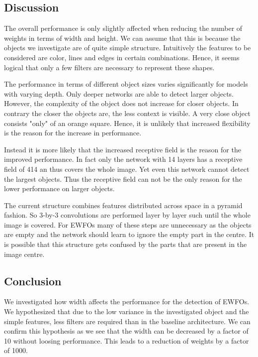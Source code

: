 \subsection{Discussion}

The overall performance is only slightly affected when reducing the number of weights in terms of width and height. We can assume that this is because the objects we investigate are of quite simple structure. Intuitively the features to be considered are color, lines and edges in certain combinations. Hence, it seems logical that only a few filters are necessary to represent these shapes.

The performance in terms of different object sizes varies significantly for models with varying depth. Only deeper networks are able to detect larger objects. However, the complexity of the object does not increase for closer objects. In contrary the closer the objects are, the less context is visible. A very close object consists "only" of an orange square. Hence, it is unlikely that increased flexibility is the reason for the increase in performance. 

Instead it is more likely that the increased receptive field is the reason for the improved performance. In fact only the network with 14 layers has a receptive field of 414 an thus covers the whole image. Yet even this network cannot detect the largest objects. Thus the receptive field can not be the only reason for the lower performance on larger objects.

The current structure combines features distributed across space in a pyramid fashion. So 3-by-3 convolutions are performed layer by layer such until the whole image is covered. For \acp{EWFO} many of these steps are unnecessary as the objects are empty and the network should learn to ignore the empty part in the centre. It is possible that this structure gets confused by the parts that are present in the image centre.

\subsection{Conclusion}

We investigated how width affects the performance for the detection of \acp{EWFO}. We hypothesized that due to the low variance in the investigated object and the simple features, less filters are required than in the baseline architecture. We can confirm this hypothesis as we see that the width can be decreased by a factor of 10 without loosing performance. This leads to a reduction of weights by a factor of 1000. 

